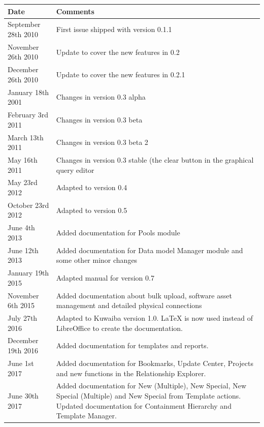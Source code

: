 \documentclass[a4paper]{article}
\begin{document}
		\begin{table}[h!]
			\centering
			\begin{tabular}{l||p{10cm}} %
				\toprule
				\textbf{Date} & \textbf{Comments}  \\
				\midrule
				September 28th 2010 & First issue shipped with version 0.1.1\\
				\midrule
				November 26th 2010 & Update to cover the new features in 0.2 \\
				\midrule
				December 26th 2010 & Update to cover the new features in 0.2.1 \\
				\midrule
				January 18th 2001 & Changes in version 0.3 alpha \\
				\midrule
				February 3rd 2011 & Changes in version 0.3 beta \\
				\midrule
				March 13th	2011 & Changes in version 0.3 beta 2 \\
				\midrule
				May 16th 2011 & Changes in version 0.3 stable (the clear button in the graphical query editor \\
				\midrule
				May 23rd 2012 & Adapted to version 0.4 \\
				\midrule
				October 23rd 2012 & Adapted to version 0.5 \\
				\midrule
				June 4th 2013 & Added documentation	for Pools module \\
				\midrule
				June 12th 2013 & Added documentation for Data model Manager module and some other minor changes\\
				\midrule
				January 19th 2015 & Adapted manual for version 0.7 \\
				\midrule
				November 6th 2015 & Added documentation about bulk upload, software asset management and detailed physical connections \\
				\midrule
				July 27th 2016 & Adapted to Kuwaiba version 1.0. LaTeX is now used instead of LibreOffice to create the documentation. \\
				\midrule
				December 19th 2016 & Added documentation for templates and reports.\\
				\midrule
				June 1st 2017 & Added documentation for Bookmarks, Update Center, Projects and new functions in the Relationship Explorer.\\
				\midrule
				June 30th 2017 & Added documentation for New (Multiple), New Special, New Special (Multiple) and New Special from Template actions. Updated documentation for Containment Hierarchy and Template Manager.\\
				\bottomrule
			\end{tabular}	
				
		\end{table}
		
\end{document}

